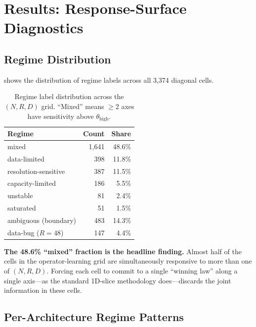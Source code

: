 \documentclass[11pt]{article}
\newcommand{\diagCells}{3{,}374}
\newcommand{\regMixed}{1{,}641}
\newcommand{\regDataLim}{398}
\newcommand{\regResSens}{387}
\newcommand{\regCapLim}{186}
\newcommand{\regUnstable}{81}
\newcommand{\regSaturated}{51}
\newcommand{\regAmbiguous}{483}
\newcommand{\regDataBug}{147}
\begin{document}
\section{Results: Response-Surface Diagnostics}
\label{sec:regimes}

\subsection{Regime Distribution}

 shows the distribution of regime labels across
all \diagCells{} diagonal cells.

\begin{table}[h]
\centering
\caption{Regime label distribution across the $(N, R, D)$ grid.
``Mixed'' means $\geq$2 axes have sensitivity above $\theta_{\mathrm{high}}$.}
\label{tab:regime-dist}
\begin{tabular}{@{}lrr@{}}
\toprule
\textbf{Regime} & \textbf{Count} & \textbf{Share} \\
\midrule
mixed                & \regMixed{}   & 48.6\% \\
data-limited         & \regDataLim{} & 11.8\% \\
resolution-sensitive & \regResSens{} & 11.5\% \\
capacity-limited     & \regCapLim{}  & 5.5\% \\
unstable             & \regUnstable{} & 2.4\% \\
saturated            & \regSaturated{} & 1.5\% \\
\midrule
ambiguous (boundary) & \regAmbiguous{} & 14.3\% \\
data-bug ($R{=}48$)  & \regDataBug{} & 4.4\% \\
\bottomrule
\end{tabular}
\end{table}

\noindent
\textbf{The 48.6\% ``mixed'' fraction is the headline finding.}
Almost half of the cells in the operator-learning grid are
simultaneously responsive to more than one of $(N, R, D)$.
Forcing each cell to commit to a single ``winning law'' along a
single axis---as the standard 1D-slice methodology does---discards
the joint information in these cells.

\subsection{Per-Architecture Regime Patterns}
\label{sec:per-arch}
\end{document}
